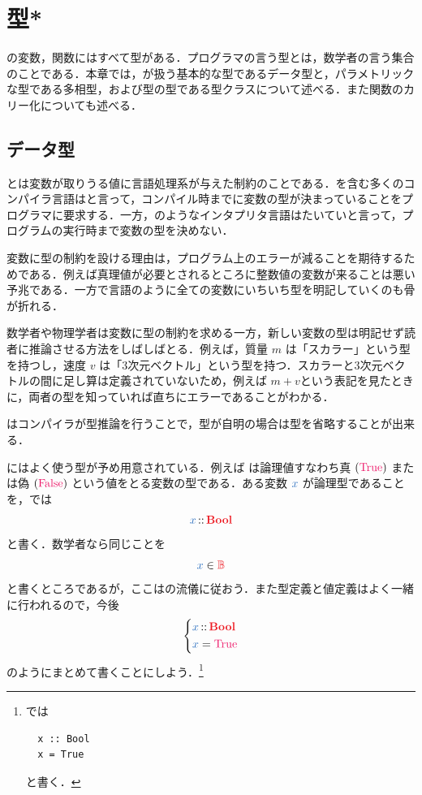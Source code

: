 \documentclass[a5paper,twoside,fleqn,draft]{jsbook}
\begin{document}
\chapter{型*}
\label{ch:type}

\begin{leader}
\haskell の変数，関数にはすべて型がある．プログラマの言う型とは，数学者の言う集合のことである．本章では，\haskell が扱う基本的な型であるデータ型と，パラメトリックな型である多相型，および型の型である型クラスについて述べる．また関数のカリー化についても述べる．
\end{leader}

\section{データ型}

とは変数が取りうる値に言語処理系が与えた制約のことである．\haskell を含む多くのコンパイラ言語はと言って，コンパイル時までに変数の型が決まっていることをプログラマに要求する．一方，\python のようなインタプリタ言語はたいていと言って，プログラムの実行時まで変数の型を決めない．

変数に型の制約を設ける理由は，プログラム上のエラーが減ることを期待するためである．例えば真理値が必要とされるところに整数値の変数が来ることは悪い予兆である．一方で\clang 言語のように全ての変数にいちいち型を明記していくのも骨が折れる．

数学者や物理学者は変数に型の制約を求める一方，新しい変数の型は明記せず読者に推論させる方法をしばしばとる．例えば，質量 $m$ は「スカラー」という型を持つし，速度 $v$ は「3次元ベクトル」という型を持つ．スカラーと3次元ベクトルの間に足し算は定義されていないため，例えば $m+v$という表記を見たときに，両者の型を知っていれば直ちにエラーであることがわかる．

\haskell はコンパイラが型推論を行うことで，型が自明の場合は型を省略することが出来る．

\separator

\haskell にはよく使う型が予め用意されている．例えば は論理値すなわち真 $(\hTrue)$ または偽 $(\hFalse)$ という値をとる変数の型である．ある変数 $\hVar{x}$ が論理型であることを，\haskell では
\begin{equation}
  \hVar{x}
  \hIsTypeOf\hBool
\end{equation}
と書く．数学者なら同じことを
\begin{equation}
  \hVar{x}
  \in\hSet{B}
\end{equation}
と書くところであるが，ここは\haskell の流儀に従おう．また型定義と値定義はよく一緒に行われるので，今後
\begin{equation}
  \left\{
  \begin{aligned}
    \hVar{x}
    &\hIsTypeOf\hBool\\
    \hVar{x}
    &=\hTrue
  \end{aligned}
  \right.
\end{equation}
のようにまとめて書くことにしよう．\footnote{\haskell では
\begin{verbatim}
  x :: Bool
  x = True
\end{verbatim}
と書く．}
\end{document}
